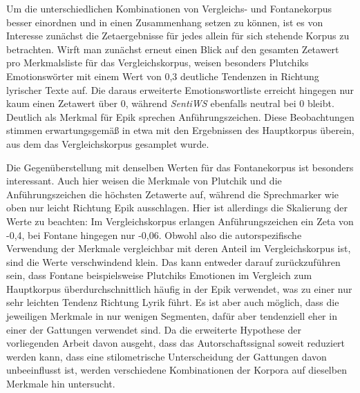 \documentclass[a4paper,10p]{article}
\begin{document}
Um die unterschiedlichen Kombinationen von Ver\-gleichs- und Fontanekorpus besser einordnen und in einen Zusammenhang setzen zu können, ist es von Interesse zunächst die Zetaergebnisse für jedes allein für sich stehende Korpus zu betrachten. Wirft man zunächst erneut einen Blick auf den gesamten Zetawert pro Merkmalsliste für das Vergleichskorpus, weisen besonders Plutchiks Emotionswörter mit einem Wert von 0,3  deutliche Tendenzen in Richtung lyrischer Texte auf. Die daraus erweiterte Emotionswortliste erreicht hingegen nur kaum einen Zetawert über 0, während \textit{SentiWS} ebenfalls neutral bei 0 bleibt. Deutlich als Merkmal für Epik sprechen Anführungszeichen. Diese Beobachtungen stimmen erwartungsgemäß in etwa mit den Ergebnissen des Hauptkorpus überein, aus dem das Vergleichskorpus gesamplet wurde.

Die Gegenüberstellung mit denselben Werten für das Fontanekorpus ist besonders interessant. Auch hier weisen die Merkmale von Plutchik und die Anführungszeichen die höchsten Zetawerte auf, während die Sprechmarker wie oben nur leicht Richtung Epik ausschlagen. Hier ist allerdings die Skalierung der Werte zu beachten: Im Vergleichskorpus erlangen Anführungszeichen ein Zeta von -0,4, bei Fontane hingegen nur -0,06. Obwohl also die autorspezifische Verwendung der Merkmale vergleichbar mit deren Anteil im Vergleichskorpus ist, sind die Werte verschwindend klein. Das kann entweder darauf zurückzuführen sein, dass Fontane beispielsweise Plutchiks Emotionen im Vergleich zum Hauptkorpus überdurchschnittlich häufig in der Epik verwendet, was zu einer nur sehr leichten Tendenz Richtung Lyrik führt. Es ist aber auch möglich, dass die jeweiligen Merkmale in nur wenigen Segmenten, dafür aber tendenziell eher in einer der Gattungen verwendet sind. Da die erweiterte Hypothese der vorliegenden Arbeit davon ausgeht, dass das Autorschaftssignal soweit reduziert werden kann, dass eine stilometrische Unterscheidung der Gattungen davon unbeeinflusst ist, werden verschiedene Kombinationen der Korpora auf dieselben Merkmale hin untersucht. \par 
\end{document}

